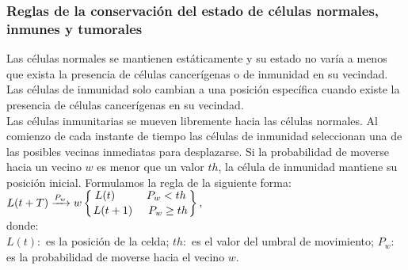 \documentclass[12pt]{amsart}
\begin{document}
\subsubsection{Reglas de la conservaci\'on del estado de c\'elulas normales, inmunes y tumorales}

Las c\'elulas normales se mantienen est\'aticamente y su estado no var\'ia a menos que exista la presencia de c\'elulas cancer\'igenas o de inmunidad en su vecindad.\\
Las c\'elulas de inmunidad solo cambian a una posici\'on espec\'ifica cuando existe la presencia de c\'elulas cancer\'igenas en su vecindad.\\
Las c\'elulas inmunitarias se mueven libremente hacia las c\'elulas normales.
Al comienzo de cada instante de tiempo las c\'elulas de inmunidad seleccionan una de las posibles vecinas inmediatas para desplazarse. Si la probabilidad de moverse hacia un vecino $w$ es menor que un valor $th$, la c\'elula de inmunidad mantiene su posici\'on inicial. Formulamos la regla de la siguiente forma:\\
$L(t+T) \xrightarrow{P_{w}} w  \displaystyle \left\{ {L(t) \hspace{1cm} P_w<th \atop L(t + 1) \hspace{.5cm} P_w \geq th } \right\},$\\

donde:\\
 $L(t):$ es la posici\'on de la celda;  $th:$ es el valor del umbral de movimiento;
 $P_{w}:$ es la probabilidad de moverse hacia el vecino $w$. 
\end{document}
